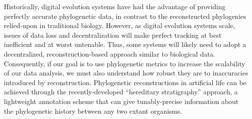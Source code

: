 Historically, digital evolution systems have had the advantage of providing perfectly accurate phylogenetic data, in contrast to the reconstructed phylogenies relied-upon in traditional biology.
However, as digital evolution systems scale, issues of data loss and decentralization will make perfect tracking at best inefficient and at worst untenable.
Thus, some systems will likely need to adopt a decentralized, reconstruction-based approach similar to biological data.
Consequently, if our goal is to use phylogenetic metrics to increase the scalability of our data analysis, we must also understand how robust they are to inaccuracies introduced by reconstruction. 
Phylogenetic reconstructions in artificial life can be achieved through the recently-developed ``hereditary stratigraphy'' approach, a lightweight annotation scheme that can give tunably-precise information about the phylogenetic history between any two extant organisms.

